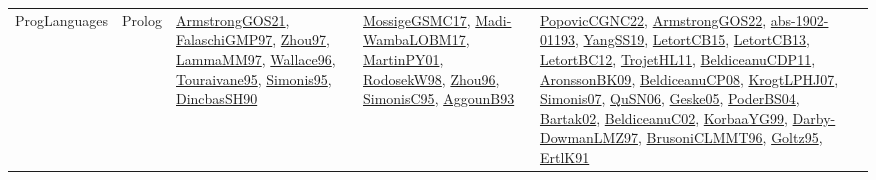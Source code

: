 {\begin{longtable}{lp{3cm}>{\raggedright}p{6cm}>{\raggedright}p{6cm}p{8cm}}
ProgLanguages & Prolog & \href{papers/ArmstrongGOS21.pdf}{ArmstrongGOS21}\cite{ArmstrongGOS21}, \href{articles/FalaschiGMP97.pdf}{FalaschiGMP97}\cite{FalaschiGMP97}, \href{articles/Zhou97.pdf}{Zhou97}\cite{Zhou97}, \href{articles/LammaMM97.pdf}{LammaMM97}\cite{LammaMM97}, \href{articles/Wallace96.pdf}{Wallace96}\cite{Wallace96}, \href{papers/Touraivane95.pdf}{Touraivane95}\cite{Touraivane95}, \href{papers/Simonis95.pdf}{Simonis95}\cite{Simonis95}, \href{articles/DincbasSH90.pdf}{DincbasSH90}\cite{DincbasSH90} & \href{papers/MossigeGSMC17.pdf}{MossigeGSMC17}\cite{MossigeGSMC17}, \href{papers/Madi-WambaLOBM17.pdf}{Madi-WambaLOBM17}\cite{Madi-WambaLOBM17}, \href{articles/MartinPY01.pdf}{MartinPY01}\cite{MartinPY01}, \href{papers/RodosekW98.pdf}{RodosekW98}\cite{RodosekW98}, \href{papers/Zhou96.pdf}{Zhou96}\cite{Zhou96}, \href{papers/SimonisC95.pdf}{SimonisC95}\cite{SimonisC95}, \href{articles/AggounB93.pdf}{AggounB93}\cite{AggounB93} & \href{papers/PopovicCGNC22.pdf}{PopovicCGNC22}\cite{PopovicCGNC22}, \href{papers/ArmstrongGOS22.pdf}{ArmstrongGOS22}\cite{ArmstrongGOS22}, \href{articles/abs-1902-01193.pdf}{abs-1902-01193}\cite{abs-1902-01193}, \href{papers/YangSS19.pdf}{YangSS19}\cite{YangSS19}, \href{articles/LetortCB15.pdf}{LetortCB15}\cite{LetortCB15}, \href{papers/LetortCB13.pdf}{LetortCB13}\cite{LetortCB13}, \href{papers/LetortBC12.pdf}{LetortBC12}\cite{LetortBC12}, \href{articles/TrojetHL11.pdf}{TrojetHL11}\cite{TrojetHL11}, \href{articles/BeldiceanuCDP11.pdf}{BeldiceanuCDP11}\cite{BeldiceanuCDP11}, \href{papers/AronssonBK09.pdf}{AronssonBK09}\cite{AronssonBK09}, \href{papers/BeldiceanuCP08.pdf}{BeldiceanuCP08}\cite{BeldiceanuCP08}, \href{papers/KrogtLPHJ07.pdf}{KrogtLPHJ07}\cite{KrogtLPHJ07}, \href{articles/Simonis07.pdf}{Simonis07}\cite{Simonis07}, \href{papers/QuSN06.pdf}{QuSN06}\cite{QuSN06}, \href{papers/Geske05.pdf}{Geske05}\cite{Geske05}, \href{articles/PoderBS04.pdf}{PoderBS04}\cite{PoderBS04}, \href{papers/Bartak02.pdf}{Bartak02}\cite{Bartak02}, \href{papers/BeldiceanuC02.pdf}{BeldiceanuC02}\cite{BeldiceanuC02}, \href{papers/KorbaaYG99.pdf}{KorbaaYG99}\cite{KorbaaYG99}, \href{articles/Darby-DowmanLMZ97.pdf}{Darby-DowmanLMZ97}\cite{Darby-DowmanLMZ97}, \href{papers/BrusoniCLMMT96.pdf}{BrusoniCLMMT96}\cite{BrusoniCLMMT96}, \href{papers/Goltz95.pdf}{Goltz95}\cite{Goltz95}, \href{papers/ErtlK91.pdf}{ErtlK91}\cite{ErtlK91}\\

\end{longtable}}
